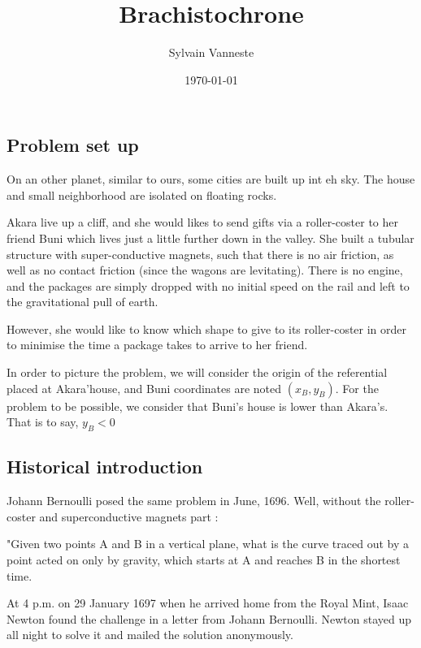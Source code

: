 \documentclass{article}
\title{Brachistochrone}
\author{Sylvain Vanneste}
\date\today
\begin{document}
\maketitle %


\subsection*{Problem set up}

On an other planet, similar to ours, some cities are built up int eh sky. The house and small neighborhood are isolated on floating rocks.  

Akara live up a cliff, and she would likes to send gifts via a roller-coster to her friend Buni which lives just a little further down in the valley. She built a tubular structure with super-conductive magnets, such that there is no air friction, as well as no contact friction (since the wagons are levitating). There is no engine, and the packages are simply dropped with no initial speed on the rail and left to the gravitational pull of earth.

However, she would like to know which shape to give to its roller-coster in order to minimise the time a package takes to arrive to her friend.



In order to picture the problem, we will consider the origin of the referential placed at Akara'house, and Buni coordinates are noted $(x_B, y_B)$. For the problem to be possible, we consider that Buni's house is lower than Akara's. That is to say, $y_B < 0$



\subsection*{Historical introduction}

Johann Bernoulli posed the same problem in June, 1696. Well, without the roller-coster and superconductive magnets part :

"Given two points A and B in a vertical plane, what is the curve traced out by a point acted on only by gravity, which starts at A and reaches B in the shortest time.

At 4 p.m. on 29 January 1697 when he arrived home from the Royal Mint, Isaac Newton found the challenge in a letter from Johann Bernoulli. Newton stayed up all night to solve it and mailed the solution anonymously.
\end{document}
